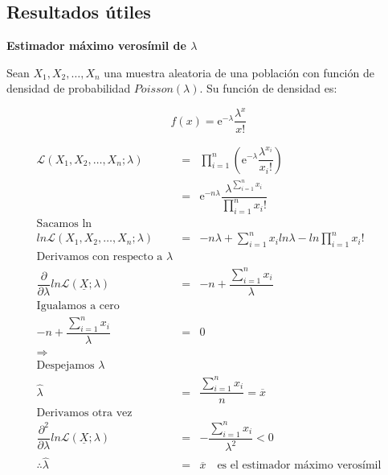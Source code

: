 \begin{appendices}
\chapter{Resultados útiles} \label{Apend_ResultadosUtiles}

\begin{defn} \label{EMVlambda}
\textbf{Estimador máximo verosímil de $\lambda$}

Sean $X_{1}, X_{2}, \ldots, X_{n}$ una muestra aleatoria de una población con función de densidad de probabilidad $Poisson(\lambda)$. Su función de densidad es:

\begin{equation}
f(x) = \mathrm{e}^{-\lambda} \dfrac{\lambda^{x}}{x!}
\end{equation}

\begin{eqnarray*}
\mathcal{L}(X_{1}, X_{2},\ldots, X_{n}; \lambda) &=& \displaystyle \prod_{i = 1}^{n} \left( \mathrm{e}^{-\lambda} \dfrac{\lambda^{x_{i}}}{x_{i}!} \right)\\
												 &=& \mathrm{e}^{-n \lambda} \dfrac{\lambda^{\displaystyle \sum_{i = 1}^{n} x_{i}}}{\displaystyle  \prod_{i = 1}^{n} x_{i}!}\\
\text{Sacamos ln}\\
ln \mathcal{L}(X_{1}, X_{2}, \ldots, X_{n};\lambda) &=& -n\lambda + \displaystyle \sum_{i = 1}^{n} x_{i} ln \lambda - ln \displaystyle  \prod_{i = 1}^{n} x_{i}! \\
\text{Derivamos con respecto a } \lambda\\
\dfrac{\partial}{\partial \lambda} ln \mathcal{L}(\underline{X};\lambda) &=& -n + \dfrac{\displaystyle \sum_{i = 1}^{n} x_{i}}{\lambda} \\
\text{Igualamos a cero}\\
-n + \dfrac{\displaystyle \sum_{i = 1}^{n} x_{i}}{\lambda} &=& 0 \\
\Rightarrow\\
\text{Despejamos } \lambda\\
\hat{\lambda} &=& \dfrac{\displaystyle \sum_{i = 1}^{n} x_{i}}{n} = \overline{x}\\
\text{Derivamos otra vez}\\
\dfrac{\partial^{2}}{\partial \lambda} ln \mathcal{L}(\underline{X};\lambda)  &=& - \dfrac{\displaystyle \sum_{i = 1}^{n} x_{i}}{\lambda^{2}} < 0\\
\therefore \hat{\lambda} &=& \overline{x} \,\,\,\,\,\, \text{es el estimador máximo verosímil}
\end{eqnarray*}
\end{defn}







\end{appendices}
